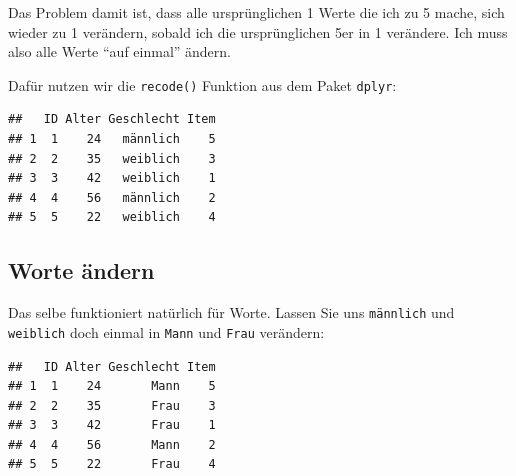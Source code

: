 \documentclass[
]{book}
\newenvironment{Shaded}{\begin{snugshade}}{\end{snugshade}}
\newcommand{\DecValTok}[1]{\textcolor[rgb]{0.00,0.00,0.81}{#1}}
\newcommand{\FunctionTok}[1]{\textcolor[rgb]{0.00,0.00,0.00}{#1}}
\newcommand{\NormalTok}[1]{#1}
\newcommand{\OtherTok}[1]{\textcolor[rgb]{0.56,0.35,0.01}{#1}}
\newcommand{\SpecialCharTok}[1]{\textcolor[rgb]{0.00,0.00,0.00}{#1}}
\newcommand{\StringTok}[1]{\textcolor[rgb]{0.31,0.60,0.02}{#1}}
\begin{document}
Das Problem damit ist, dass alle ursprünglichen 1 Werte die ich zu 5 mache, sich wieder zu 1 verändern, sobald ich die ursprünglichen 5er in 1 verändere. Ich muss also alle Werte ``auf einmal'' ändern.

Dafür nutzen wir die \texttt{recode()} Funktion aus dem Paket \texttt{dplyr}:

\begin{Shaded}
\end{Shaded}

\begin{verbatim}
##   ID Alter Geschlecht Item
## 1  1    24   männlich    5
## 2  2    35   weiblich    3
## 3  3    42   weiblich    1
## 4  4    56   männlich    2
## 5  5    22   weiblich    4
\end{verbatim}

\hypertarget{worte-uxe4ndern}{%
\subsection{Worte ändern}\label{worte-uxe4ndern}}

Das selbe funktioniert natürlich für Worte. Lassen Sie uns \texttt{männlich} und \texttt{weiblich} doch einmal in \texttt{Mann} und \texttt{Frau} verändern:

\begin{Shaded}
\end{Shaded}

\begin{verbatim}
##   ID Alter Geschlecht Item
## 1  1    24       Mann    5
## 2  2    35       Frau    3
## 3  3    42       Frau    1
## 4  4    56       Mann    2
## 5  5    22       Frau    4
\end{verbatim}
\end{document}
